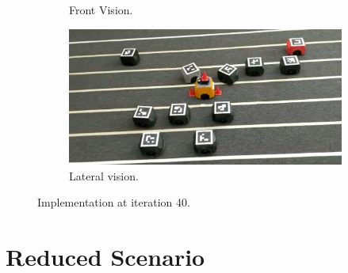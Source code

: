 \begin{appendix}
\begin{figure}[H]
\begin{subfigure}[b]{0.4\textwidth}
    \caption{Front Vision.}
    \label{fig:second}
\end{subfigure}
\hfill
\begin{subfigure}[b]{0.50\textwidth}
    \includegraphics[width=\textwidth]{Anexos/obs_avoid/obs_avoid_it40_cam2.png}
    \caption{Lateral vision.}
    \label{fig:third}
\end{subfigure}
\caption{Implementation at iteration 40.}
\label{fig:figures}
\end{figure}




\section{Reduced Scenario}


\end{appendix}
